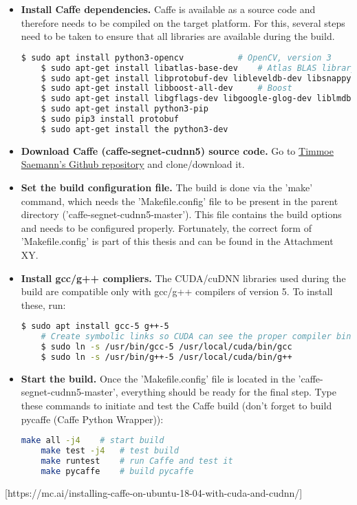 \begin{itemize}
		
	\item \textbf{Install Caffe dependencies.} Caffe is available as a source code and therefore needs to be compiled on the target platform. For this, several steps need to be taken to ensure that all libraries are available during the build. 
	
	\begin{lstlisting}[language=bash]
	$ sudo apt install python3-opencv 			# OpenCV, version 3
	$ sudo apt-get install libatlas-base-dev 	# Atlas BLAS library
	$ sudo apt-get install libprotobuf-dev libleveldb-dev libsnappy-dev libopencv-dev libhdf5-serial-dev protobuf-compiler
	$ sudo apt-get install libboost-all-dev		# Boost
	$ sudo apt-get install libgflags-dev libgoogle-glog-dev liblmdb-dev
	$ sudo apt-get install python3-pip
	$ sudo pip3 install protobuf
	$ sudo apt-get install the python3-dev
	\end{lstlisting}
	
	\item \textbf{Download Caffe (caffe-segnet-cudnn5) source code.} Go to \href{https://github.com/TimoSaemann/caffe-segnet-cudnn5}{Timmoe Saemann's Github repository} and clone/download it. 
	\item \textbf{Set the build configuration file.} The build is done via the 'make' command, which needs the 'Makefile.config' file to be present in the parent directory ('caffe-segnet-cudnn5-master'). This file contains the build options and needs to be configured properly. Fortunately, the correct form of 'Makefile.config' is part of this thesis and can be found in the Attachment XY. 
	
	\item \textbf{Install gcc/g++ compliers.} The CUDA/cuDNN libraries used during the build are compatible only with gcc/g++ compilers of version 5. To install these, run:
	
	\begin{lstlisting}[language=bash]
	$ sudo apt install gcc-5 g++-5
	# Create symbolic links so CUDA can see the proper compiler binaries
	$ sudo ln -s /usr/bin/gcc-5 /usr/local/cuda/bin/gcc
	$ sudo ln -s /usr/bin/g++-5 /usr/local/cuda/bin/g++
	\end{lstlisting}
	
	\item \textbf{Start the build.} Once the 'Makefile.config' file is located in the 'caffe-segnet-cudnn5-master', everything should be ready for the final step. Type these commands to initiate and test the Caffe build (don't forget to build pycaffe (Caffe Python Wrapper)):
	
	\begin{lstlisting}[language=bash]
	make all -j4	# start build
	make test -j4	# test build
	make runtest	# run Caffe and test it
	make pycaffe	# build pycaffe 
	\end{lstlisting} 	
\end{itemize}
[https://mc.ai/installing-caffe-on-ubuntu-18-04-with-cuda-and-cudnn/]